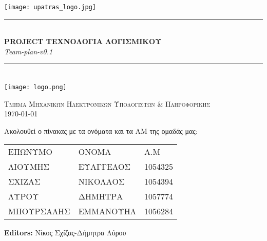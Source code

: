 \documentclass[12pt,a4paper,oneside]{article}
\newcommand{\HRule}{\rule{\linewidth}{0.5mm}}
\begin{document}
\renewcommand{\contentsname}{Περιεχόμενα}

\renewcommand{\refname}{Αναφορές}

\begin{titlepage}
\begin{center}

\texttt{[image: upatras\_logo.jpg]}~\\[2cm]


\HRule \\[0.4cm]
{ \LARGE 
  \textbf{PROJECT TΕΧΝΟΛΟΓΙΑ ΛΟΓΙΣΜΙΚΟΥ}\\[0.4cm]
  \emph{Team-plan-v0.1}\\[0.4cm]
}
\HRule \\[1.5cm]



{ \large
  \texttt{[image: logo.png]}~\\[2cm]
 
}

\vfill

\textsc{\large Τμήμα Μηχανικών Ηλεκτρονικών Υπολογιστών \& Πληροφορικής}\\[0.4cm]


{\large {}\today}
 
\end{center}
\end{titlepage}
\pagestyle{fancy}
\centering
Ακολουθεί ο πίνακας με τα ονόματα και τα ΑΜ της ομαδάς μας:

\centering
\begin{tabular}{ |p{4cm}|p{4cm}|p{3cm}|}
\arrayrulecolor{gray}
 \hline
 \multicolumn{3}{|c|}{Μέλη} \\
 \hline
 ΕΠΩΝΥΜΟ& ΟΝΟΜΑ & Α.M\\
 \hline
 ΛΙΟΥΜΗΣ   & ΕΥΑΓΓΕΛΟΣ    & 1054325\\
 ΣΧΙΖΑΣ &  ΝΙΚΟΛΑΟΣ & 1054394\\
 ΛΥΡΟΥ & ΔΗΜΗΤΡΑ & 1057774\\
 ΜΠΟΥΡΣΑΛΗΣ   & ΕΜΜΑΝΟΥΗΛ & 1056284\\
\hline 

\end{tabular}


\vspace{7cm}
\raggedright
\textbf{Editors:}
\newline
Νίκος Σχίζας-Δήμητρα Λύρου
\end{document}
